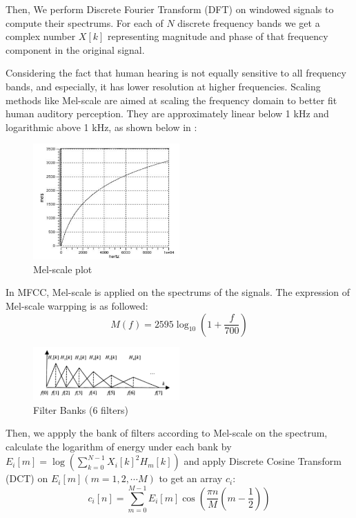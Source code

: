 Then, We perform Discrete Fourier Transform (DFT) on windowed signals to compute their spectrums.
For each of $N$ discrete frequency bands we get a complex number $X[k]$ representing
magnitude and phase of that frequency component in the original signal.

Considering the fact that human hearing is not equally sensitive to all frequency bands, and especially,
it has lower resolution at higher frequencies.
Scaling methods like Mel-scale are aimed at scaling the frequency domain to better fit human auditory perception.
They are approximately linear below 1 kHz and logarithmic above 1 kHz, as shown below in :
\begin{figure}[H]
  \centering
  \includegraphics[width=0.5\textwidth]{img/mel-scale.png}
  \caption{Mel-scale plot \label{fig:melscale}}
\end{figure}

In MFCC, Mel-scale is applied on the spectrums of the signals.
The expression of Mel-scale warpping is as followed:
\[ M(f) = 2595 \log_{10}(1 + \dfrac{f}{700}) \]

\begin{figure}[H]
  \centering
  \includegraphics[width=0.5\textwidth]{img/bank.png}
  \caption{Filter Banks (6 filters) \label{fig:bank}}
\end{figure}
Then,  we appply the bank of filters according to Mel-scale on the spectrum,
calculate the logarithm of energy under each bank by $E_i[m] = \log (\sum_{k=0}^{N-1}{X_i[k]^2 H_m[k]}) $ and apply Discrete
Cosine Transform (DCT) on $E_i[m](m = 1, 2, \cdots M) $ to get an array $c_i $:
\[ c_i[n] = \sum_{m=0}^{M-1}{E_i[m]\cos(\dfrac{\pi n}{M}(m - \dfrac{1}{2}))} \]

